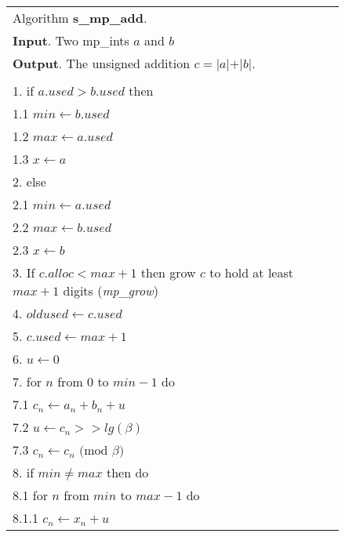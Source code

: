 \documentclass[b5paper]{book}
\begin{document}
\newpage
\begin{figure}[!here]
\begin{center}
\begin{small}
\begin{tabular}{l}
\hline Algorithm \textbf{s\_mp\_add}. \\
\textbf{Input}.   Two mp\_ints $a$ and $b$ \\
\textbf{Output}.  The unsigned addition $c = \vert a \vert + \vert b \vert$. \\
\hline \\
1.  if $a.used > b.used$ then \\
\hspace{+3mm}1.1  $min \leftarrow b.used$ \\
\hspace{+3mm}1.2  $max \leftarrow a.used$ \\
\hspace{+3mm}1.3  $x   \leftarrow a$ \\
2.  else  \\
\hspace{+3mm}2.1  $min \leftarrow a.used$ \\
\hspace{+3mm}2.2  $max \leftarrow b.used$ \\
\hspace{+3mm}2.3  $x   \leftarrow b$ \\
3.  If $c.alloc < max + 1$ then grow $c$ to hold at least $max + 1$ digits (\textit{mp\_grow}) \\
4.  $oldused \leftarrow c.used$ \\
5.  $c.used \leftarrow max + 1$ \\
6.  $u \leftarrow 0$ \\
7.  for $n$ from $0$ to $min - 1$ do \\
\hspace{+3mm}7.1  $c_n \leftarrow a_n + b_n + u$ \\
\hspace{+3mm}7.2  $u \leftarrow c_n >> lg(\beta)$ \\
\hspace{+3mm}7.3  $c_n \leftarrow c_n \mbox{ (mod }\beta\mbox{)}$ \\
8.  if $min \ne max$ then do \\
\hspace{+3mm}8.1  for $n$ from $min$ to $max - 1$ do \\
\hspace{+6mm}8.1.1  $c_n \leftarrow x_n + u$ \\

\end{tabular}
\end{small}
\end{center}
\end{figure}
\end{document}
